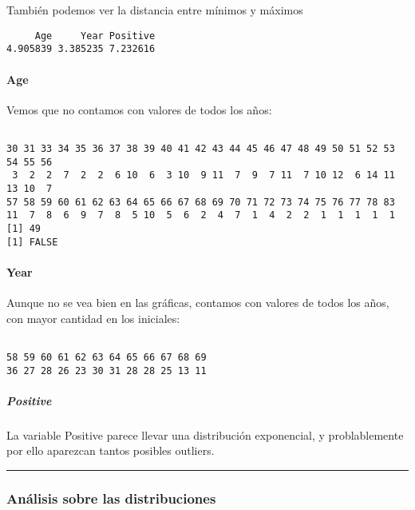 \documentclass[
]{article}
\begin{document}
También podemos ver la distancia entre mínimos y máximos

\begin{verbatim}
     Age     Year Positive 
4.905839 3.385235 7.232616 
\end{verbatim}

\hypertarget{age}{%
\paragraph{Age}\label{age}}

Vemos que no contamos con valores de todos los años:

\begin{verbatim}

30 31 33 34 35 36 37 38 39 40 41 42 43 44 45 46 47 48 49 50 51 52 53 54 55 56 
 3  2  2  7  2  2  6 10  6  3 10  9 11  7  9  7 11  7 10 12  6 14 11 13 10  7 
57 58 59 60 61 62 63 64 65 66 67 68 69 70 71 72 73 74 75 76 77 78 83 
11  7  8  6  9  7  8  5 10  5  6  2  4  7  1  4  2  2  1  1  1  1  1 
[1] 49
[1] FALSE
\end{verbatim}

\hypertarget{year}{%
\paragraph{Year}\label{year}}

Aunque no se vea bien en las gráficas, contamos con valores de todos los
años, con mayor cantidad en los iniciales:

\begin{verbatim}

58 59 60 61 62 63 64 65 66 67 68 69 
36 27 28 26 23 30 31 28 28 25 13 11 
\end{verbatim}

\hypertarget{positive}{%
\subparagraph{Positive}\label{positive}}

La variable Positive parece llevar una distribución exponencial, y
problablemente por ello aparezcan tantos posibles outliers.

\begin{center}\rule{0.5\linewidth}{0.5pt}\end{center}

\hypertarget{anuxe1lisis-sobre-las-distribuciones}{%
\subsubsection{Análisis sobre las
distribuciones}\label{anuxe1lisis-sobre-las-distribuciones}}
\end{document}
